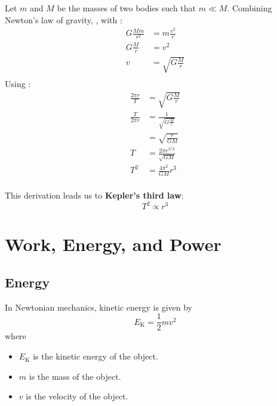 \documentclass[a4paper, titlepage]{book}
\begin{document}
Let \(m\) and \(M\) be the masses of two bodies such that \(m \ll M\).
Combining Newton's law of gravity,
,
with :
\begin{equation}
    \begin{aligned}
        G \frac{M m}{r^2} &= m \frac{v^2}{r} \\
        G \frac{M}{r} &= v^2 \\
        v &= \sqrt{G \frac{M}{r}} \\
    \end{aligned}
\end{equation}
Using :
\begin{equation}
    \begin{aligned}
        \frac{2 \pi r}{T} &= \sqrt{G \frac{M}{r}} \\
        \frac{T}{2 \pi r} &= \frac{1}{\sqrt{G \frac{M}{r}}} \\
        &= \sqrt{\frac{r}{G M}} \\
        T &= \frac{2 \pi r^{3/2}}{\sqrt{G M}} \\
        T^2 &= \frac{4 \pi^2}{GM} r^3 \\
    \end{aligned}
\end{equation}

This derivation leads us to \textbf{Kepler's third law}:
\begin{equation}
    T^2 \propto r^3
\end{equation}


\chapter{Work, Energy, and Power}

\section{Energy}

In Newtonian mechanics, kinetic energy is given by
\begin{equation} \label{eq:linear-kinetic-energy}
    E_\mathrm{K} = \frac{1}{2} m v^2
\end{equation}
where
\begin{itemize}
    \item \(E_\mathrm{K}\) is the kinetic energy of the object.
    \item \(m\) is the mass of the object.
    \item \(v\) is the velocity of the object.
\end{itemize}
\end{document}
